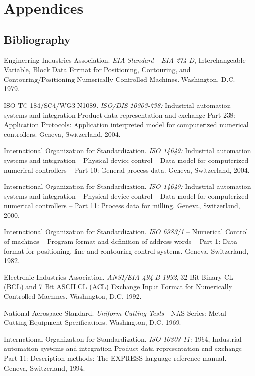 
\appendix
\section*{Appendices}
\renewcommand{\thesubsection}{\Alph{subsection}}
\lstset{language=xml,numbers=left,xleftmargin=2em}

\subsection{Bibliography}

Engineering Industries Association. \textit{EIA Standard - EIA-274-D}, Interchangeable Variable, Block Data Format for Positioning, Contouring, and Contouring/Positioning Numerically Controlled Machines. Washington, D.C. 1979.

ISO TC 184/SC4/WG3 N1089. \textit{ISO/DIS 10303-238:} Industrial automation systems and integration  Product data representation and exchange  Part 238: Application Protocols: Application interpreted model for computerized numerical controllers. Geneva, Switzerland, 2004.

International Organization for Standardization. \textit{ISO 14649:} Industrial automation systems and integration – Physical device control – Data model for computerized numerical controllers – Part 10: General process data. Geneva, Switzerland, 2004.

International Organization for Standardization. \textit{ISO 14649:} Industrial automation systems and integration – Physical device control – Data model for computerized numerical controllers – Part 11: Process data for milling. Geneva, Switzerland, 2000.

International Organization for Standardization. \textit{ISO 6983/1} – Numerical Control of machines – Program format and definition of address words – Part 1: Data format for positioning, line and contouring control systems. Geneva, Switzerland, 1982.

Electronic Industries Association. \textit{ANSI/EIA-494-B-1992}, 32 Bit Binary CL (BCL) and 7 Bit ASCII CL (ACL) Exchange Input Format for Numerically Controlled Machines. Washington, D.C. 1992.

National Aerospace Standard. \textit{Uniform Cutting Tests} - NAS Series: Metal Cutting Equipment Specifications. Washington, D.C. 1969.

International Organization for Standardization. \textit{ISO 10303-11:} 1994, Industrial automation systems and integration  Product data representation and exchange  Part 11: Description methods: The EXPRESS language reference manual. Geneva, Switzerland, 1994.

